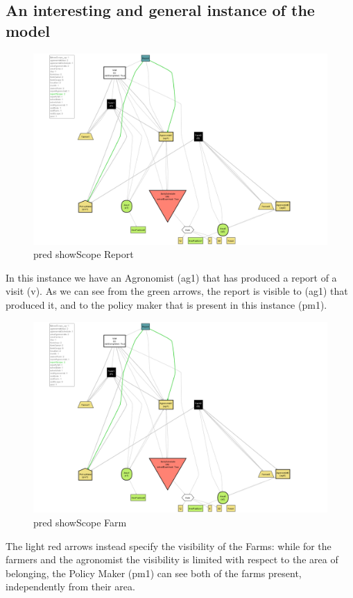 \documentclass[10pt]{report}
\begin{document}
\subsection{An interesting and general instance of the model}
\begin{figure}[H]
    \centering
    \includegraphics[width=450px]{Alloy/reportScope.png}
    \caption{pred showScope Report}
\end{figure}
In this instance we have an Agronomist (ag1) that has produced a report of a visit (v). As we can see from the green arrows, the report is visible to (ag1) that produced it, and to the policy maker that is present in this instance (pm1).

\begin{figure}[H]
    \centering
    \includegraphics[width=450px]{Alloy/reportScope.png}
    \caption{pred showScope Farm}
\end{figure}
The light red arrows instead specify the visibility of the Farms: while for the farmers and the agronomist the visibility is limited with respect to the area of belonging, the Policy Maker (pm1) can see both of the farms present, independently from their area. 
\end{document}
